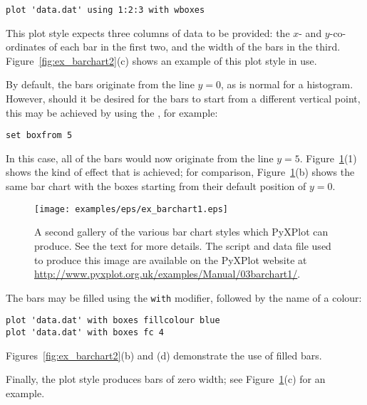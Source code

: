 \begin{verbatim} 
plot 'data.dat' using 1:2:3 with wboxes
\end{verbatim}

\noindent This plot style expects three columns of data to be provided: the
$x$- and $y$-co-ordinates of each bar in the first two, and the width of the
bars in the third.  Figure~\ref{fig:ex_barchart2}(c) shows an example of this
plot style in use.

By default, the bars originate from the line $y=0$, as is normal for a
histogram. However, should it be desired for the bars to start from a different
vertical point, this may be achieved by using the ,
for example:

\begin{verbatim} 
set boxfrom 5
\end{verbatim}

\noindent In this case, all of the bars would now originate from the line
$y=5$. Figure~\ref{fig:ex_barchart1}(1) shows the kind of effect that is
achieved; for comparison, Figure~\ref{fig:ex_barchart1}(b) shows the same bar
chart with the boxes starting from their default position of $y=0$.

\begin{figure}
\begin{center}
\texttt{[image: examples/eps/ex\_barchart1.eps]}
\end{center}
\caption[A second gallery of the various bar chart styles which PyXPlot can
produce]
{A second gallery of the various bar chart styles which PyXPlot can
produce. See the text for more details.  The script and data file used to
produce this image are available on the PyXPlot website at
\protect\url{http://www.pyxplot.org.uk/examples/Manual/03barchart1/}.}
\label{fig:ex_barchart1}
\end{figure}

The bars may be filled using the {\tt with}  modifier,
followed by the name of a colour:

\begin{verbatim} 
plot 'data.dat' with boxes fillcolour blue
plot 'data.dat' with boxes fc 4
\end{verbatim}

\noindent Figures~\ref{fig:ex_barchart2}(b) and (d) demonstrate the use of
filled bars.

Finally, the  plot style produces bars of zero width; see
Figure~\ref{fig:ex_barchart1}(c) for an example.

